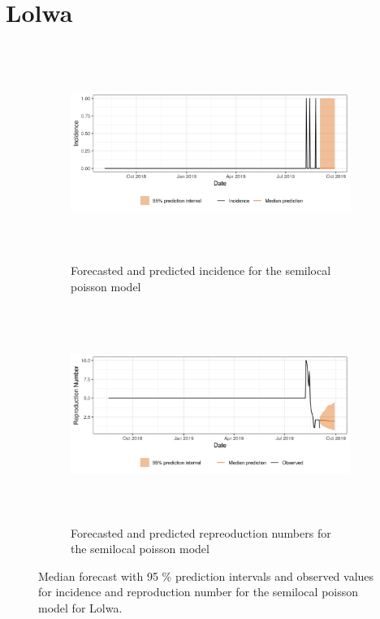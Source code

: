  \section{ Lolwa }\begin{figure}[H]\begin{subfigure}{\textwidth}  \centering  \includegraphics[width=0.9\linewidth, height=7cm]{../output/Lolwa_predictions.png}  \caption{Forecasted and predicted incidence for the semilocal poisson model}\end{subfigure}

\begin{subfigure}{\textwidth}  \centering  \includegraphics[width=0.9\linewidth, height=7cm]{../output/Lolwa_Rs.png}  \caption{Forecasted and predicted repreoduction numbers for the semilocal poisson model}\end{subfigure}  \caption{Median forecast with 95 \% prediction intervals and observed values for incidence and reproduction number for the semilocal poisson model for Lolwa.}\end{figure}

